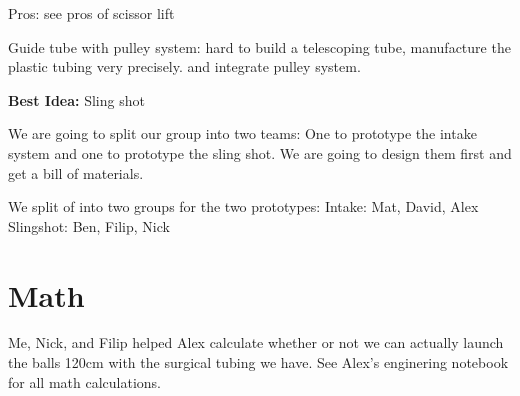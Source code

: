 Pros: see pros of scissor lift

\textbf{}{Guide tube with pulley system:}
hard to build a telescoping tube, manufacture the plastic tubing very precisely. and integrate pulley system.

\textbf{Best Idea:}
 Sling shot

We are going to split our group into two teams: One to prototype the intake system and one to prototype the sling shot. We are going to design them first and get a bill of materials. 

We split of into two groups for the two prototypes: 
Intake: Mat, David, Alex
Slingshot: Ben, Filip, Nick 

\section*{Math}
Me, Nick, and Filip helped Alex calculate whether or not we can actually launch the balls 120cm with the surgical tubing we have. See Alex's enginering notebook for all math calculations. 
